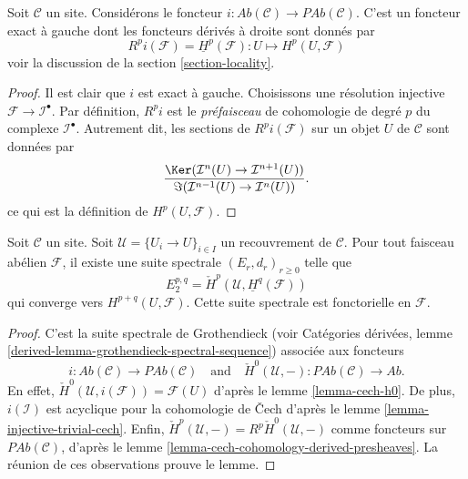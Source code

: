 \begin{lemma}
\label{lemma-include}
Soit $\mathcal{C}$ un site.
Considérons le foncteur
$i : \textit{Ab}(\mathcal{C}) \to \textit{PAb}(\mathcal{C})$.
C'est un foncteur exact à gauche dont les foncteurs dérivés à droite sont
donnés par
$$
R^pi(\mathcal{F}) = \underline{H}^p(\mathcal{F}) :
U \longmapsto H^p(U, \mathcal{F})
$$
voir la discussion de la section \ref{section-locality}.
\end{lemma}

\begin{proof}
Il est clair que $i$ est exact à gauche.
Choisissons une résolution injective $\mathcal{F} \to \mathcal{I}^\bullet$.
Par définition, $R^pi$ est le {\it préfaisceau} de cohomologie de degré $p$
du complexe $\mathcal{I}^\bullet$. Autrement dit, les sections de
$R^pi(\mathcal{F})$ sur un objet $U$ de $\mathcal{C}$ sont données par
$$
\frac{\Ker(\mathcal{I}^n(U) \to \mathcal{I}^{n + 1}(U))}
{\Im(\mathcal{I}^{n - 1}(U) \to \mathcal{I}^n(U))}.
$$
ce qui est la définition de $H^p(U, \mathcal{F})$.
\end{proof}

\begin{lemma}
\label{lemma-cech-spectral-sequence}
Soit $\mathcal{C}$ un site. Soit $\mathcal{U} = \{U_i \to U\}_{i \in I}$
un recouvrement de $\mathcal{C}$. Pour tout faisceau abélien $\mathcal{F}$,
il existe une suite spectrale $(E_r, d_r)_{r \geq 0}$ telle que
$$
E_2^{p, q} = \check{H}^p(\mathcal{U}, \underline{H}^q(\mathcal{F}))
$$
qui converge vers $H^{p + q}(U, \mathcal{F})$.
Cette suite spectrale est fonctorielle en $\mathcal{F}$.
\end{lemma}

\begin{proof}
C'est la suite spectrale de Grothendieck (voir Catégories dérivées,
lemme \ref{derived-lemma-grothendieck-spectral-sequence}) associée aux
foncteurs
$$
i :  \textit{Ab}(\mathcal{C}) \to \textit{PAb}(\mathcal{C})
\quad\text{and}\quad
\check{H}^0(\mathcal{U}, - ) : \textit{PAb}(\mathcal{C})
\to \textit{Ab}.
$$
En effet, $\check{H}^0(\mathcal{U}, i(\mathcal{F})) = \mathcal{F}(U)$ d'après
le lemme \ref{lemma-cech-h0}. De plus, $i(\mathcal{I})$ est acyclique pour la
cohomologie de {\v C}ech d'après le
lemme \ref{lemma-injective-trivial-cech}. Enfin,
$\check{H}^p(\mathcal{U}, -) = R^p\check{H}^0(\mathcal{U}, -)$ comme foncteurs
sur $\textit{PAb}(\mathcal{C})$, d'après le
lemme \ref{lemma-cech-cohomology-derived-presheaves}.
La réunion de ces observations prouve le lemme.
\end{proof}

